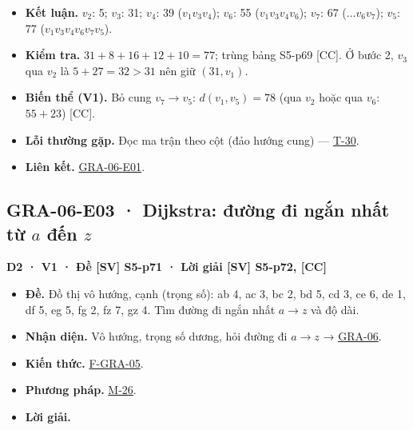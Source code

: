 \documentclass[
  10pt,
  twoside,openany]{book}
\providecommand{\tightlist}{%
  \setlength{\itemsep}{0pt}\setlength{\parskip}{0pt}}
\begin{document}
\begin{itemize}
\tightlist
\item
  \textbf{Kết luận.} \(v_2\): 5; \(v_3\): 31; \(v_4\): 39
  (\(v_1v_3v_4\)); \(v_6\): 55 (\(v_1v_3v_4v_6\)); \(v_7\): 67
  (\(\dots v_6v_7\)); \(v_5\): 77 (\(v_1v_3v_4v_6v_7v_5\)).
\item
  \textbf{Kiểm tra.} \(31+8+16+12+10=77\); trùng bảng S5-p69 {[}CC{]}. Ở
  bước 2, \(v_3\) qua \(v_2\) là \(5+27=32>31\) nên giữ \((31,v_1)\).
\item
  \textbf{Biến thể (V1).} Bỏ cung \(v_7\to v_5\): \(d(v_1,v_5)=78\) (qua
  \(v_2\) hoặc qua \(v_6\): \(55+23\)) {[}CC{]}.
\item
  \textbf{Lỗi thường gặp.} Đọc ma trận theo cột (đảo hướng cung) ---
  \protect\hyperlink{T-30}{T-30}.
\item
  \textbf{Liên kết.} \protect\hyperlink{GRA-06-E01}{GRA-06-E01}.
\end{itemize}

\hypertarget{GRA-06-E03}{%
\subsection{\texorpdfstring{GRA-06-E03 · Dijkstra: đường đi ngắn nhất từ
\(a\) đến
\(z\)}{GRA-06-E03 · Dijkstra: đường đi ngắn nhất từ a đến z}}\label{GRA-06-E03}}

\textbf{D2 · V1 · Đề {[}SV{]} S5-p71 · Lời giải {[}SV{]} S5-p72,
{[}CC{]}}

\begin{itemize}
\tightlist
\item
  \textbf{Đề.} Đồ thị vô hướng, cạnh (trọng số): ab 4, ac 3, bc 2, bd 5,
  cd 3, ce 6, de 1, df 5, eg 5, fg 2, fz 7, gz 4. Tìm đường đi ngắn nhất
  \(a\to z\) và độ dài.
\item
  \textbf{Nhận diện.} Vô hướng, trọng số dương, hỏi đường đi \(a\to z\)
  → \protect\hyperlink{GRA-06}{GRA-06}.
\item
  \textbf{Kiến thức.} \protect\hyperlink{F-GRA-05}{F-GRA-05}.
\item
  \textbf{Phương pháp.} \protect\hyperlink{M-26}{M-26}.
\item
  \textbf{Lời giải.}
\end{itemize}
\end{document}
